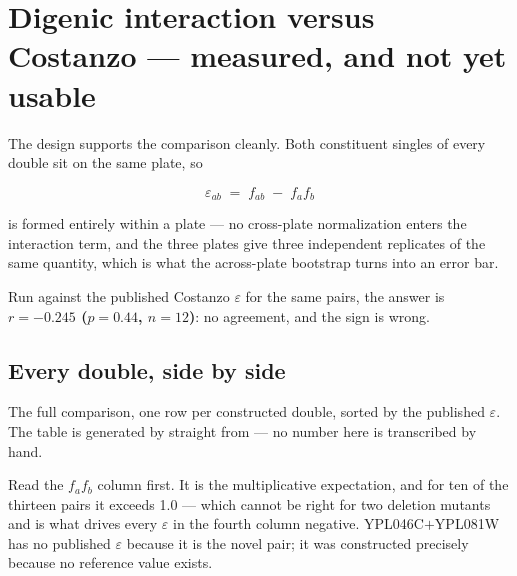\section{Digenic interaction versus Costanzo --- measured, and not yet usable}
\label{sec:run4-eps}

The design supports the comparison cleanly. Both constituent singles of every double sit on
the same plate, so

\begin{equation}
  \varepsilon_{ab} \;=\; f_{ab} \;-\; f_a f_b
  \label{eq:eps}
\end{equation}

is formed entirely within a plate --- no cross-plate normalization enters the interaction
term, and the three plates give three independent replicates of the same quantity, which is
what the across-plate bootstrap turns into an error bar.

Run against the published Costanzo $\varepsilon$ for the same pairs, the answer is
\textbf{$r=-0.245$ ($p=0.44$, $n=12$)}: no agreement, and the sign is wrong.

\subsection{Every double, side by side}

The full comparison, one row per constructed double, sorted by the published
$\varepsilon$. The table is generated by
 straight from
 --- no number here is transcribed by hand.


Read the $f_a f_b$ column first. It is the multiplicative expectation, and for ten of the
thirteen pairs it exceeds 1.0 --- which cannot be right for two deletion mutants and is what
drives every $\varepsilon$ in the fourth column negative. YPL046C$+$YPL081W has no published
$\varepsilon$ because it is the novel pair; it was constructed precisely because no reference
value exists.

